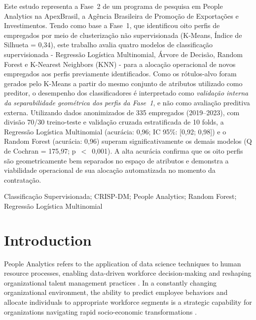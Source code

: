\documentclass[alpha-refs,english]{RBCA_v3.0}
\begin{document}
\begin{frontmatter}
\begin{resumo}
Este estudo representa a Fase~2 de um programa de pesquisa em People Analytics na ApexBrasil, a Ag\^encia Brasileira de Promo\c{c}\~ao de Exporta\c{c}\~oes e Investimentos. Tendo como base a Fase~1, que identificou oito perfis de empregados por meio de clusteriza\c{c}\~ao n\~ao supervisionada (K-Means, \'Indice de Silhueta = 0,34), este trabalho avalia quatro modelos de classifica\c{c}\~ao supervisionada - Regress\~ao Log\'istica Multinomial, \'Arvore de Decis\~ao, Random Forest e K-Nearest Neighbors (KNN) - para a aloca\c{c}\~ao operacional de novos empregados aos perfis previamente identificados. Como os r\'otulos-alvo foram gerados pelo K-Means a partir do mesmo conjunto de atributos utilizado como preditor, o desempenho dos classificadores \'e interpretado como \textit{valida\c{c}\~ao interna da separabilidade geom\'etrica dos perfis da Fase~1}, e n\~ao como avalia\c{c}\~ao preditiva externa. Utilizando dados anonimizados de 335 empregados (2019--2023), com divis\~ao 70/30 treino-teste e valida\c{c}\~ao cruzada estratificada de 10 folds, a Regress\~ao Log\'istica Multinomial (acur\'acia: 0,96; IC 95\%: [0,92; 0,98]) e o Random Forest (acur\'acia: 0,96) superam significativamente os demais modelos (Q de Cochran = 175,97; p~$<$~0,001). A alta acur\'acia confirma que os oito perfis s\~ao geometricamente bem separados no espa\c{c}o de atributos e demonstra a viabilidade operacional de sua aloca\c{c}\~ao automatizada no momento da contrata\c{c}\~ao.
\end{resumo}

\begin{palavras_chave}
Classifica\c{c}\~ao Supervisionada; CRISP-DM; People Analytics; Random Forest; Regress\~ao Log\'istica Multinomial
\end{palavras_chave}

\end{frontmatter}


\section{Introduction}
People Analytics refers to the application of data science techniques to human resource processes, enabling data-driven workforce decision-making and reshaping organizational talent management practices \citep{Ferrar2021,Margherita2022}. In a constantly changing organizational environment, the ability to predict employee behaviors and allocate individuals to appropriate workforce segments is a strategic capability for organizations navigating rapid socio-economic transformations \citep{Polzer2022}.
\end{document}
